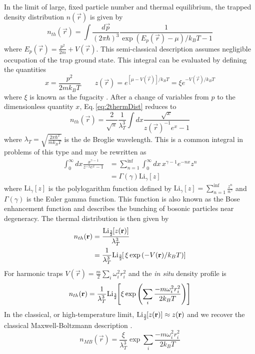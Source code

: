 In the limit of large, fixed particle number and thermal equilibrium, the trapped density distribution $n(\vec{r})$ is given by
\begin{equation} \label{eq:2thermDist}
	n_{th}(\vec{r}) = \int \frac{d\vec{p}}{(2\pi\hbar)^3} \frac{1}{\exp{(E_p(\vec{r}) - \mu)/k_BT} - 1}
\end{equation}
where $E_p(\vec{r}) = \frac{p^2}{2m} + V(\vec{r})$.
This semi-classical description assumes negligible occupation of the trap ground state.
This integral can be evaluated by defining the quantities
\begin{equation*}
	x = \frac{p^2}{2mk_BT} \quad\quad z(\vec{r}) = e^{[\mu - V(\vec{r})]/k_BT} = \xi e^{-V(\vec{r})/k_BT}
\end{equation*}
where $\xi$ is known as the fugacity \cite{psm02}.
After a change of variables from $p$ to the dimensionless quantity $x$, Eq.\,\ref{eq:2thermDist} reduces to
\begin{equation}
	n_{th}(\vec{r}) = \frac{2}{\sqrt{\pi}}\frac{1}{\lambda_T^3}\int dx \frac{\sqrt{x}}{z(\vec{r})^{-1}e^x-1}
\end{equation}
where $\lambda_T = \sqrt{\frac{2 \pi \hbar^2}{m k_B T}}$ is the de Broglie wavelength.
This is a common integral in problems of this type and may be rewritten as \cite{Demarco1998, Ketterle1999, psm02}
\begin{equation}
\begin{split}
	\int_0^{\infty}dx\frac{x^{\gamma-1}}{z^{-1}e^x-1} &= \sum_{n=1}^{\inf}\int_0^{\infty}dx \,x^{\gamma-1}e^{-nx}z^n \\
	&=\Gamma(\gamma)\text{Li}_{\gamma}[z]
\end{split}
\end{equation}
where $\text{Li}_{\gamma}[z]$ is the polylogarithm function defined by $\text{Li}_{\gamma}[z] = \sum_{n=1}^{\inf}\frac{z^n}{n^{\gamma}}$ and $\Gamma(\gamma)$ is the Euler gamma function.
This function is also known as the Bose enhancement function \cite{Ketterle1999} and describes the bunching of bosonic particles near degeneracy.
The thermal distribution is then given by
\begin{equation}
	\begin{split}
	n_{th}(\mathbf{r}) &= \frac{\text{Li}_{\scriptscriptstyle\frac{3}{2}\!}\!\left[ z(\mathbf{r}) \right]}{\lambda_T^3} \\
				 &= \frac{1}{\lambda_T^3}\text{Li}_{\scriptscriptstyle\frac{3}{2}\!}\!\left[ \,\xi\,\text{exp}\left( {-V(\mathbf{r})/k_BT} \right) \right]
	\end{split}
\end{equation}
For harmonic traps $V(\vec{r}) = \frac{m}{2}\displaystyle\sum_i\omega_i^2r_i^2$ and the \textit{in situ} density profile is
\begin{equation} \label{eq:harmTrapDist}
	n_{th}(\mathbf{r}) = \frac{1}{\lambda_T^3}\text{Li}_{\scriptscriptstyle\frac{3}{2}\!}\!\left[ \xi \,\text{exp}\left( {\sum_i\frac{-m\omega_i^2r_i^2}{2 k_B T}} \right) \right]
\end{equation}
In the classical, or high-temperature limit, $\text{Li}_{\scriptscriptstyle\frac{3}{2}\!}\!\left[ z(\mathbf{r}) \right] \approx z(\mathbf{r})$ and we recover the classical Maxwell-Boltzmann description \cite{psm02}.
\begin{equation}
	n_{MB}(\vec{r}) = \frac{\xi}{\lambda_T^3}\exp{\sum_i\frac{-m\omega_i^2r_i^2}{2 k_B T}}
\end{equation}


